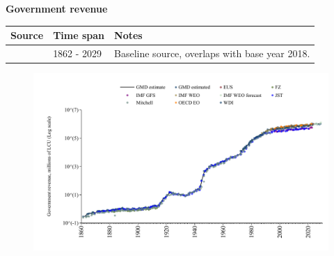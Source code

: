 \documentclass[12pt,a4paper,landscape]{article}
\begin{document}
\begin{adjustbox}{max totalsize={\paperwidth}{\paperheight},center}
\begin{minipage}[t][\textheight][t]{\textwidth}
\vspace*{0.5cm}
{}
\begin{center}
{\Large\bfseries Government revenue}
\end{center}
\vspace{0.5cm}
\begin{table}[H]
\centering
\small
\begin{tabular}{|l|l|l|}
\hline
\textbf{Source} & \textbf{Time span} & \textbf{Notes} \\
\hline
\rowcolor{white}\cite{GMD_estimated}& 1862 - 2029 &Baseline source, overlaps with base year 2018. \\
\hline
\end{tabular}
\end{table}
\begin{figure}[H]
\centering
\includegraphics[width=\textwidth,height=0.6\textheight,keepaspectratio]{graphs/ITA_govrev.pdf}
\end{figure}
\end{minipage}
\end{adjustbox}
\end{document}
